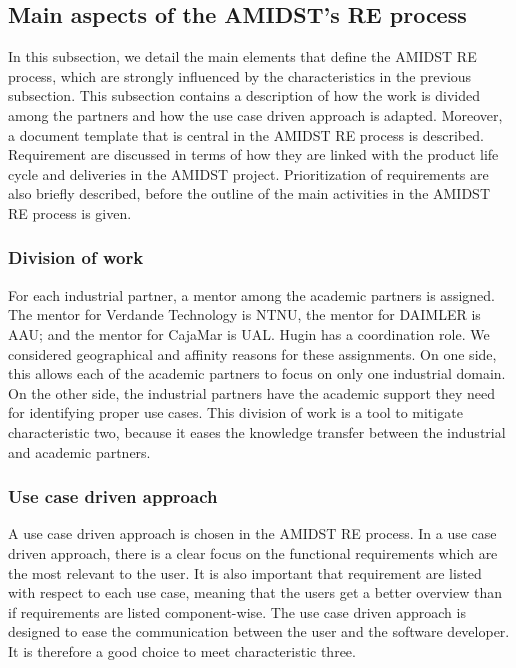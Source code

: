 \documentclass[11pt, oneside]{article}   	%
\begin{document}
\subsection{Main aspects of the AMIDST's RE process}
\label{sec:reprocess}

In this subsection, we detail the main elements that define the AMIDST RE process, which are strongly influenced by the characteristics in the previous subsection.  This subsection contains a description of how the work is divided among the partners and how the use case driven approach is adapted.  Moreover, a document template that is central in the AMIDST RE process is described.  Requirement are discussed in terms of how they are linked with the product life cycle and deliveries in the AMIDST project.  Prioritization of requirements are also briefly described, before the outline of the main activities in the AMIDST RE process is given.

\subsubsection*{Division of work}

For each industrial partner, a mentor among the academic partners is assigned. The mentor for Verdande Technology is NTNU, the mentor for DAIMLER is AAU; and the mentor for CajaMar is UAL. Hugin has a coordination role. We considered geographical and affinity reasons for these assignments.  On one side, this allows each of the academic partners to focus on only one industrial domain.  On the other side, the industrial partners have the academic support they need for identifying proper use cases.  This division of work is a tool to mitigate characteristic two, because it eases the knowledge transfer between the industrial and academic partners. 

\subsubsection*{Use case driven approach}

A use case driven approach is chosen in the AMIDST RE process.  In a use case driven approach, there is a clear focus on the functional requirements which are the most relevant to the user.  It is also important that requirement are listed with respect to each use case, meaning that the users get a better overview than if requirements are listed component-wise. The use case driven approach is designed to ease the communication between the user and the software developer.  It is therefore a good choice to meet characteristic three.  
\end{document}
